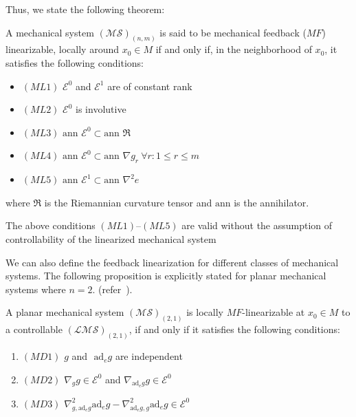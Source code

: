 Thus, we state the following theorem:
\begin{thm}\label{thm:mfl}
    A mechanical system $(\mathcal{MS})_{(n,m)}$ is said to be mechanical feedback ($MF$) linearizable, locally around $x_0 \in M$ if and only if, in the neighborhood of $x_0$, it satisfies the following conditions:

    \begin{itemize}
        \item $(ML1)$ $\mathcal{E}^0$ and $\mathcal{E}^1$ are of constant rank
        \item $(ML2)$ $\mathcal{E}^0$ is involutive
        \item $(ML3)$ $\text{ann } \mathcal{E}^{0} \subset \text{ann } \mathfrak{R}$
        \item $(ML4)$ $\text{ann } \mathcal{E}^0 \subset \text{ann } \nabla g_r \ \forall r: 1 \leq r \leq m$
        \item $(ML5)$ $\text{ann } \mathcal{E}^1 \subset \text{ann } \nabla^2 e$
    \end{itemize}
where $\mathfrak{R}$ is the Riemannian curvature tensor and $\text{ann}$ is the annihilator.
\end{thm}

\begin{rmk}
    The above conditions $(ML1)$--$(ML5)$ are valid without the assumption of controllability of the linearized mechanical system
\end{rmk}

We can also define the feedback linearization for different classes of mechanical systems. The following proposition is explicitly stated for planar mechanical systems where $n=2$. (refer~\cite{nowicki}).

\begin{prop}
\label{prop:planar_mech}
A planar mechanical system $\mathcal{(MS)}_{(2,1)}$ is locally $MF$-linearizable at $x_0 \in M$ to a controllable $\mathcal{(LMS)}_{(2,1)}$, if and only if it satisfies the following conditions:
\begin{enumerate}
    \item $(MD1)$ $g$ and $\text{ ad}_e g$ are independent
    \item $(MD2)$ $\nabla_g g \in \mathcal{E}^0$ and $\nabla_{\text{ad}_e g} g \in \mathcal{E}^0$
    \item $(MD3)$ $\nabla^2_{g, \text{ad}_e g} \text{ad}_e g - \nabla^2_{\text{ad}_e g, g} \text{ad}_e g \in \mathcal{E}^0$
\end{enumerate}
\end{prop}